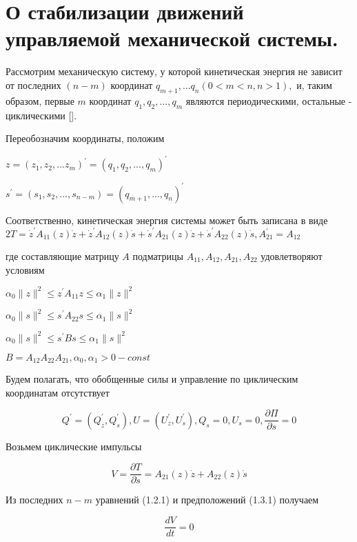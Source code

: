 \section{О стабилизации движений управляемой механической системы.} \label{p13}

Рассмотрим механическую систему, у которой кинетическая энергия не зависит от последних $(n-m)$ координат $q_{m+1},... q_n (0 < m < n, n > 1),$ и, таким образом, первые $m$ координат $q_1, q_2, ... , q_m$ являются периодическими, остальные - циклическими [].

Переобозначим координаты, положим

$z = (z_1, z_2, ... z_m)^{'} = (q_1, q_2, ..., q_m)^{'}$

$s^{'} = (s_1, s_2, ... , s_{n-m}) = (q_{m + 1}, ..., q_n)^{'}$

Соответственно, кинетическая энергия системы может быть записана в виде $2T = \dot z^{'} A_{11} (z) \dot z + \dot z^{'} A_{12} (z) \dot s + \dot s^{'} A_{21} (z) \dot z + \dot s^{'} A_{22} (z) \dot s, A_21^{'} = A_{12}$

где составляющие матрицу $A$ подматрицы $A_{11}, A_{12}, A_{21}, A_{22}$ удовлетворяют условиям 

$\alpha_0 \| z \|^2 \le z^{'} A_{11} z \le \alpha_1  \| z \|^2$

$\alpha_0 \| s \|^2 \le s^{'} A_{22} s \le \alpha_1  \| s \|^2$

$\alpha_0 \| s \|^2 \le s^{'} B s \le \alpha_1  \| s \|^2$

$B = A_{12} A_{22} A_{21}, \alpha_0, \alpha_1 > 0 - const$

Будем полагать, что обобщенные силы и управление по циклическим координатам отсутствует

\begin{equation}
Q^{'} = (Q_{z}^{'}, Q_{s}^{'}), U = (U_{z}^{'}, U_{s}^{'}), Q_s = 0, U_s = 0, \frac{\partial \Pi}{\partial s} = 0
\end{equation}

Возьмем циклические импульсы

\begin{equation}
V = \frac{\partial T}{\partial \dot s} = A_{21} (z) \dot z + A_{22} (z) \dot s
\end{equation}

Из последних $n - m$ уравнений (1.2.1) и предположений (1.3.1) получаем 

\begin{equation}
\frac{d V}{d t} = 0
\end{equation}

